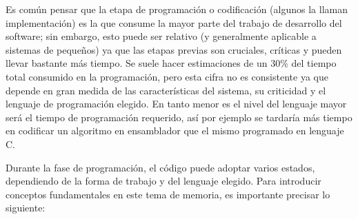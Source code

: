 \documentclass[12pt,legalpaper]{report}
\begin{document}
Es común pensar que la etapa de programación o codificación (algunos la llaman implementación) es la que consume la mayor parte del trabajo de desarrollo del software; sin embargo, esto puede ser relativo (y generalmente aplicable a sistemas de pequeños) ya que las etapas previas son cruciales, críticas y pueden llevar bastante más tiempo. Se suele hacer estimaciones de un 30\% del tiempo total consumido en la programación, pero esta cifra no es consistente ya que depende en gran medida de las características del sistema, su criticidad y el lenguaje de programación elegido. En tanto menor es el nivel del lenguaje mayor será el tiempo de programación requerido, así por ejemplo se tardaría más tiempo en codificar un algoritmo en ensamblador que el mismo programado en lenguaje C.

Durante la fase de programación, el código puede adoptar varios estados, dependiendo de la forma de trabajo y del lenguaje elegido.  Para introducir conceptos fundamentales en este tema de memoria, es importante precisar lo siguiente:
\end{document}
